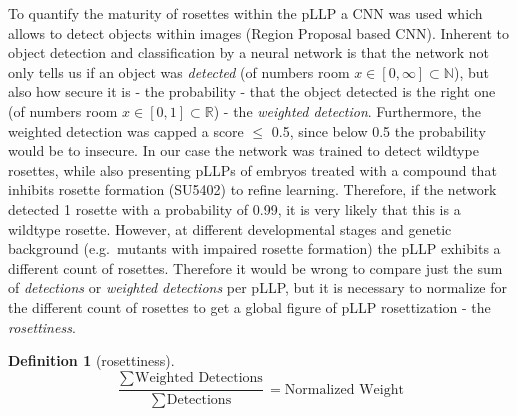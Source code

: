 \documentclass[11pt,singlespacinge,twoside]{reedthesis} %
\theoremstyle{definition}
\newtheorem{definition}{Definition}[chapter]
\theoremstyle{definition}
\theoremstyle{definition}
\theoremstyle{remark}
\begin{document}
To quantify the maturity of rosettes within the pLLP a CNN was used which allows to detect objects within images (Region Proposal based CNN). Inherent to object detection and classification by a neural network is that the network not only tells us if an object was \emph{detected} (of numbers room \(x\in[0, \infty]\subset\mathbb{N}\)), but also how secure it is - the probability - that the object detected is the right one (of numbers room \(x\in[0, 1]\subset\mathbb{R}\)) - the \emph{weighted detection}. Furthermore, the weighted detection was capped a score \(\leq\) 0.5, since below 0.5 the probability would be to insecure. In our case the network was trained to detect wildtype rosettes, while also presenting pLLPs of embryos treated with a compound that inhibits rosette formation (SU5402) to refine learning. Therefore, if the network detected 1 rosette with a probability of 0.99, it is very likely that this is a wildtype rosette. However, at different developmental stages and genetic background (e.g.~mutants with impaired rosette formation) the pLLP exhibits a different count of rosettes. Therefore it would be wrong to compare just the sum of \emph{detections} or \emph{weighted detections} per pLLP, but it is necessary to normalize for the different count of rosettes to get a global figure of pLLP rosettization - the \emph{rosettiness}.
\begin{definition}[rosettiness]
\protect\hypertarget{def:unnamed-chunk-11}{}{\label{def:unnamed-chunk-11} {} }\[\frac{\sum_{} \textrm{Weighted Detections}}{\sum_{} \textrm{Detections}} = \textrm{Normalized Weight}\]
\end{definition}
\end{document}
